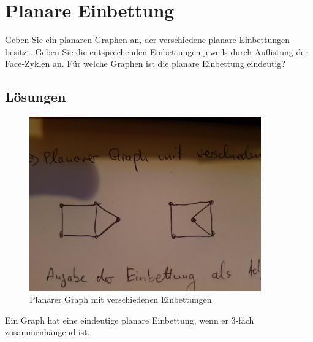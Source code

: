 \section{Planare Einbettung}
Geben Sie ein planaren Graphen an, der verschiedene planare Einbettungen besitzt. Geben Sie die entsprechenden Einbettungen jeweils durch Auflistung der Face-Zyklen an. Für welche Graphen ist die planare Einbettung eindeutig?

\subsection*{Lösungen}

\begin{figure}[h]
    \begin{center}
        \includegraphics[width=10cm]{planar}
        \caption{Planarer Graph mit verschiedenen Einbettungen}
        \label{fig:}
    \end{center}
\end{figure}

Ein Graph hat eine eindeutige planare Einbettung, wenn er 3-fach zusammenhängend ist.
